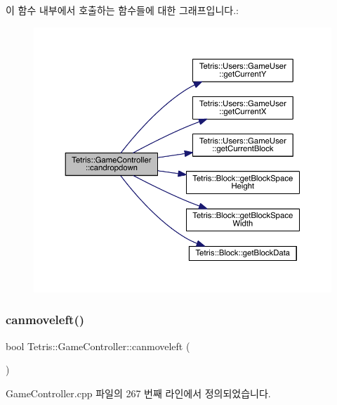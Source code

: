 이 함수 내부에서 호출하는 함수들에 대한 그래프입니다.\+:
\nopagebreak
\begin{figure}[H]
\begin{center}
\leavevmode
\includegraphics[width=350pt]{db/dd2/class_tetris_1_1_game_controller_ac4993d5ad8640ac617fec341fdb301ee_cgraph}
\end{center}
\end{figure}
\mbox{\label{class_tetris_1_1_game_controller_ae541cf926ccdce47a185c94a0c80b642}} 
\subsubsection{\texorpdfstring{canmoveleft()}{canmoveleft()}\hspace{0.1cm}{\footnotesize\ttfamily [1/2]}}
{\footnotesize\ttfamily bool Tetris\+::\+Game\+Controller\+::canmoveleft (\begin{DoxyParamCaption}{ }\end{DoxyParamCaption})}



Game\+Controller.\+cpp 파일의 267 번째 라인에서 정의되었습니다.


